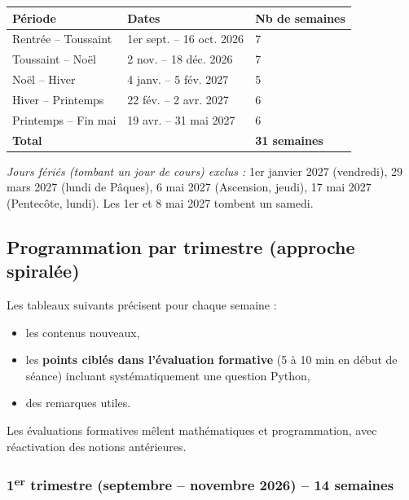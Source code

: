 \documentclass[a4paper,12pt]{article}
\begin{document}
	\begin{center}
		\begin{tabular}{|C{4.5cm}|C{5cm}|C{2.5cm}|}
			\hline
			\textbf{Période} & \textbf{Dates} & \textbf{Nb de semaines} \\
			\hline
			Rentrée – Toussaint & 1er sept. – 16 oct. 2026 & 7 \\
			Toussaint – Noël & 2 nov. – 18 déc. 2026 & 7 \\
			Noël – Hiver & 4 janv. – 5 fév. 2027 & 5 \\
			Hiver – Printemps & 22 fév. – 2 avr. 2027 & 6 \\
			Printemps – Fin mai & 19 avr. – 31 mai 2027 & 6 \\
			\hline
			\textbf{Total} & & \textbf{31 semaines} \\
			\hline
		\end{tabular}
	\end{center}
	
	\textit{Jours fériés (tombant un jour de cours) exclus :} 1er janvier 2027 (vendredi), 29 mars 2027 (lundi de Pâques), 6 mai 2027 (Ascension, jeudi), 17 mai 2027 (Pentecôte, lundi). Les 1er et 8 mai 2027 tombent un samedi.
	
	\subsection{Programmation par trimestre (approche spiralée)}
	Les tableaux suivants précisent pour chaque semaine :
	\begin{itemize}
		\item les contenus nouveaux,
		\item les \textbf{points ciblés dans l’évaluation formative} (5 à 10 min en début de séance) incluant systématiquement une question Python,
		\item des remarques utiles.
	\end{itemize}
	Les évaluations formatives mêlent mathématiques et programmation, avec réactivation des notions antérieures.
	
	\newpage
	\subsubsection{1\textsuperscript{er} trimestre (septembre – novembre 2026) – 14 semaines}
	
\end{document}
